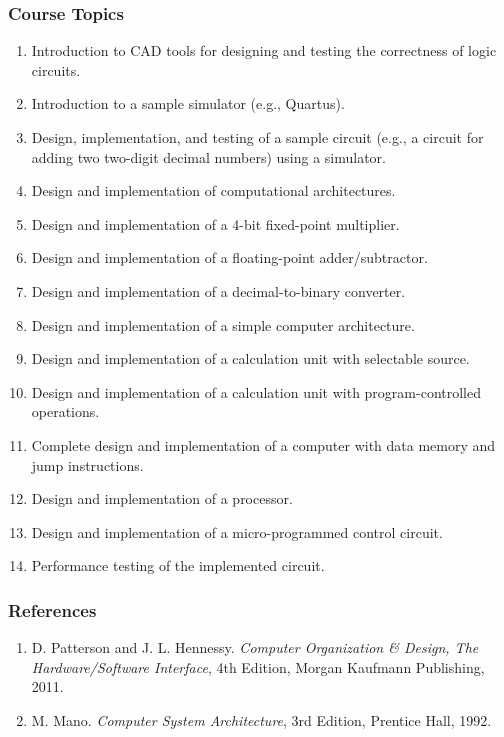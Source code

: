\documentclass[12pt]{article}
\begin{document}
\subsubsection*{Course Topics}
\begin{enumerate}
    \item Introduction to CAD tools for designing and testing the correctness of logic circuits.
    \item Introduction to a sample simulator (e.g., Quartus).
    \item Design, implementation, and testing of a sample circuit (e.g., a circuit for adding two two-digit decimal numbers) using a simulator.
    \item Design and implementation of computational architectures.
    \item Design and implementation of a 4-bit fixed-point multiplier.
    \item Design and implementation of a floating-point adder/subtractor.
    \item Design and implementation of a decimal-to-binary converter.
    \item Design and implementation of a simple computer architecture.
    \item Design and implementation of a calculation unit with selectable source.
    \item Design and implementation of a calculation unit with program-controlled operations.
    \item Complete design and implementation of a computer with data memory and jump instructions.
    \item Design and implementation of a processor.
    \item Design and implementation of a micro-programmed control circuit.
    \item Performance testing of the implemented circuit.
\end{enumerate}

\subsubsection*{References}
\begin{enumerate}
    \item D. Patterson and J. L. Hennessy. \textit{Computer Organization \& Design, The Hardware/Software Interface}, 4th Edition, Morgan Kaufmann Publishing, 2011.
    \item M. Mano. \textit{Computer System Architecture}, 3rd Edition, Prentice Hall, 1992.
\end{enumerate}
\end{document}
